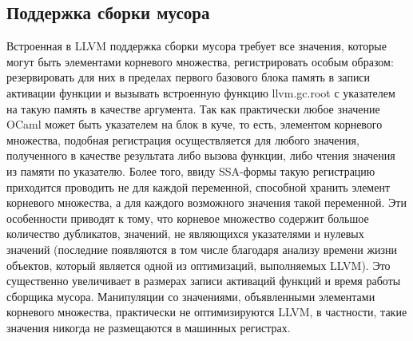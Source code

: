 \documentclass[a4paper, 12pt]{article}
\begin{document}
\subsection{Поддержка сборки мусора}
Встроенная в LLVM поддержка сборки мусора требует все значения, которые могут быть элементами корневого множества,
регистрировать особым образом: резервировать для них в пределах первого базового блока память в записи активации функции
и вызывать встроенную функцию llvm.gc.root с указателем на такую память в качестве аргумента. Так как практически любое
значение OCaml может быть указателем на блок в куче, то есть, элементом корневого множества, подобная регистрация
осуществляется для любого значения, полученного в качестве результата либо вызова функции, либо чтения значения из
памяти по указателю. Более того, ввиду SSA-формы такую регистрацию приходится проводить не для каждой переменной,
способной хранить элемент корневого множества, а для каждого возможного значения такой переменной. Эти особенности
приводят к тому, что корневое множество содержит большое количество дубликатов, значений, не являющихся указателями и
нулевых значений (последние появляются в том числе благодаря анализу времени жизни объектов, который является одной из
оптимизаций, выполняемых LLVM). Это существенно увеличивает в размерах записи активаций функций и время работы сборщика
мусора. Манипуляции со значениями, объявленными элементами корневого множества, практически не оптимизируются LLVM, в
частности, такие значения никогда не размещаются в машинных регистрах.
\end{document}
